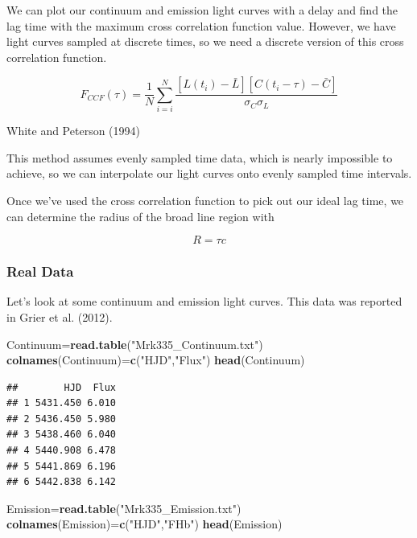 \documentclass[]{article}
\newenvironment{Shaded}{\begin{snugshade}}{\end{snugshade}}
\newcommand{\KeywordTok}[1]{\textcolor[rgb]{0.13,0.29,0.53}{\textbf{#1}}}
\newcommand{\NormalTok}[1]{#1}
\newcommand{\StringTok}[1]{\textcolor[rgb]{0.31,0.60,0.02}{#1}}
\begin{document}
We can plot our continuum and emission light curves with a delay and
find the lag time with the maximum cross correlation function value.
However, we have light curves sampled at discrete times, so we need a
discrete version of this cross correlation function.

\[F_{CCF}(\tau)=\frac{1}{N}\sum_{i=i}^N\frac{[L(t_i)-\bar L][C(t_i-\tau)-\bar C]}{\sigma_C \sigma_L}\]

White and Peterson (1994)

This method assumes evenly sampled time data, which is nearly impossible
to achieve, so we can interpolate our light curves onto evenly sampled
time intervals.

Once we've used the cross correlation function to pick out our ideal lag
time, we can determine the radius of the broad line region with

\[R=\tau c\]

\hypertarget{real-data}{%
\subsubsection{Real Data}\label{real-data}}

Let's look at some continuum and emission light curves. This data was
reported in Grier et al. (2012).

\begin{Shaded}
\begin{Highlighting}[]
\NormalTok{Continuum=}\KeywordTok{read.table}\NormalTok{(}\StringTok{"Mrk335_Continuum.txt"}\NormalTok{)}
\KeywordTok{colnames}\NormalTok{(Continuum)=}\KeywordTok{c}\NormalTok{(}\StringTok{"HJD"}\NormalTok{,}\StringTok{"Flux"}\NormalTok{)}
\KeywordTok{head}\NormalTok{(Continuum)}
\end{Highlighting}
\end{Shaded}

\begin{verbatim}
##        HJD  Flux
## 1 5431.450 6.010
## 2 5436.450 5.980
## 3 5438.460 6.040
## 4 5440.908 6.478
## 5 5441.869 6.196
## 6 5442.838 6.142
\end{verbatim}

\begin{Shaded}
\begin{Highlighting}[]
\NormalTok{Emission=}\KeywordTok{read.table}\NormalTok{(}\StringTok{"Mrk335_Emission.txt"}\NormalTok{)}
\KeywordTok{colnames}\NormalTok{(Emission)=}\KeywordTok{c}\NormalTok{(}\StringTok{"HJD"}\NormalTok{,}\StringTok{"FHb"}\NormalTok{)}
\KeywordTok{head}\NormalTok{(Emission)}
\end{Highlighting}
\end{Shaded}
\end{document}
